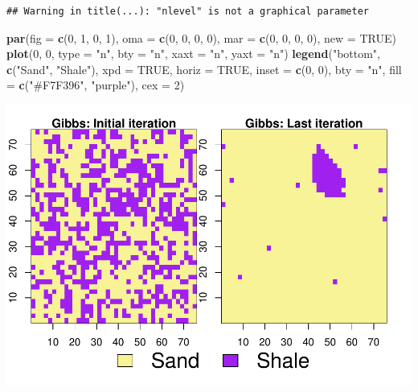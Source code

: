 \documentclass[
]{article}
\newenvironment{Shaded}{\begin{snugshade}}{\end{snugshade}}
\newcommand{\DataTypeTok}[1]{\textcolor[rgb]{0.13,0.29,0.53}{#1}}
\newcommand{\DecValTok}[1]{\textcolor[rgb]{0.00,0.00,0.81}{#1}}
\newcommand{\KeywordTok}[1]{\textcolor[rgb]{0.13,0.29,0.53}{\textbf{#1}}}
\newcommand{\NormalTok}[1]{#1}
\newcommand{\OtherTok}[1]{\textcolor[rgb]{0.56,0.35,0.01}{#1}}
\newcommand{\StringTok}[1]{\textcolor[rgb]{0.31,0.60,0.02}{#1}}
\begin{document}
\begin{verbatim}
## Warning in title(...): "nlevel" is not a graphical parameter
\end{verbatim}

\begin{Shaded}
\begin{Highlighting}[]
\KeywordTok{par}\NormalTok{(}\DataTypeTok{fig =} \KeywordTok{c}\NormalTok{(}\DecValTok{0}\NormalTok{, }\DecValTok{1}\NormalTok{, }\DecValTok{0}\NormalTok{, }\DecValTok{1}\NormalTok{), }\DataTypeTok{oma =} \KeywordTok{c}\NormalTok{(}\DecValTok{0}\NormalTok{, }\DecValTok{0}\NormalTok{, }\DecValTok{0}\NormalTok{, }\DecValTok{0}\NormalTok{), }\DataTypeTok{mar =} \KeywordTok{c}\NormalTok{(}\DecValTok{0}\NormalTok{, }\DecValTok{0}\NormalTok{, }\DecValTok{0}\NormalTok{, }\DecValTok{0}\NormalTok{), }\DataTypeTok{new =} \OtherTok{TRUE}\NormalTok{)}
\KeywordTok{plot}\NormalTok{(}\DecValTok{0}\NormalTok{, }\DecValTok{0}\NormalTok{, }\DataTypeTok{type =} \StringTok{"n"}\NormalTok{, }\DataTypeTok{bty =} \StringTok{"n"}\NormalTok{, }\DataTypeTok{xaxt =} \StringTok{"n"}\NormalTok{, }\DataTypeTok{yaxt =} \StringTok{"n"}\NormalTok{)}
\KeywordTok{legend}\NormalTok{(}\StringTok{"bottom"}\NormalTok{, }\KeywordTok{c}\NormalTok{(}\StringTok{"Sand"}\NormalTok{, }\StringTok{"Shale"}\NormalTok{), }\DataTypeTok{xpd =} \OtherTok{TRUE}\NormalTok{, }\DataTypeTok{horiz =} \OtherTok{TRUE}\NormalTok{, }\DataTypeTok{inset =} \KeywordTok{c}\NormalTok{(}\DecValTok{0}\NormalTok{, }
    \DecValTok{0}\NormalTok{), }\DataTypeTok{bty =} \StringTok{"n"}\NormalTok{, }\DataTypeTok{fill =} \KeywordTok{c}\NormalTok{(}\StringTok{"#F7F396"}\NormalTok{, }\StringTok{"purple"}\NormalTok{), }\DataTypeTok{cex =} \DecValTok{2}\NormalTok{)}
\end{Highlighting}
\end{Shaded}

\includegraphics{Ex3_files/figure-latex/unnamed-chunk-9-2.pdf}
\end{document}
